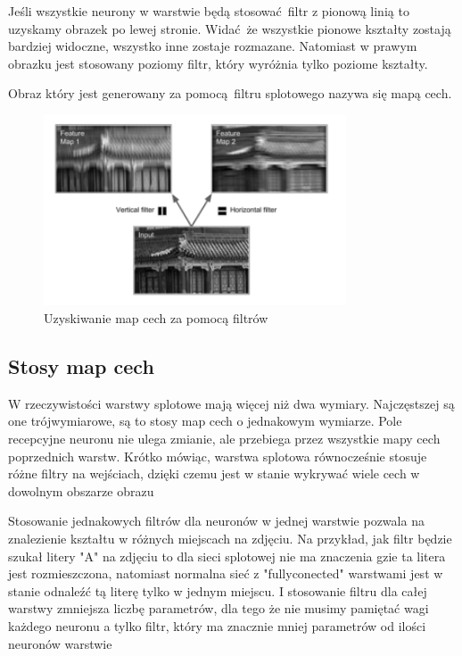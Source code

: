 \documentclass{article}
\begin{document}
Jeśli wszystkie neurony w warstwie będą stosować filtr z pionową linią to uzyskamy obrazek po lewej stronie. Widać że wszystkie pionowe kształty zostają bardziej widoczne, wszystko inne zostaje rozmazane. Natomiast w prawym obrazku jest stosowany poziomy filtr, który wyróżnia tylko poziome kształty.

Obraz który jest generowany za pomocą filtru splotowego nazywa się mapą cech.

\begin{figure}[H]
	\centering
	\includegraphics[width=0.8\textwidth,keepaspectratio=true]{filters}
	\caption{Uzyskiwanie map cech za pomocą filtrów \cite{geron}}
	\label{filters}
\end{figure}

\subsection{Stosy map cech}
W rzeczywistości warstwy splotowe mają więcej niż dwa wymiary. Najczęstszej są one trójwymiarowe, są to stosy map cech o jednakowym wymiarze. Pole recepcyjne neuronu nie ulega zmianie, ale przebiega przez wszystkie mapy cech poprzednich warstw. Krótko mówiąc, warstwa splotowa równocześnie stosuje różne filtry na wejściach, dzięki czemu jest w stanie wykrywać wiele cech w dowolnym obszarze obrazu \cite{geron}

Stosowanie jednakowych filtrów dla neuronów w jednej warstwie pozwala na znalezienie kształtu w różnych miejscach na zdjęciu. Na przykład, jak filtr będzie szukał litery "A" na zdjęciu to dla sieci splotowej nie ma znaczenia gzie ta litera jest rozmieszczona, natomiast normalna sieć z "fullyconected" warstwami jest w stanie odnaleźć tą literę tylko w jednym miejscu. I stosowanie filtru dla całej warstwy zmniejsza liczbę parametrów, dla tego że nie musimy pamiętać wagi każdego neuronu a tylko filtr, który ma znacznie mniej parametrów od ilości neuronów warstwie\cite{geron}
\end{document}
